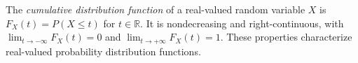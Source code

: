 
The \emph{cumulative distribution function} of a real-valued random variable $X$ is $F_X(t)=P(X\le t)$ for $t\in\mathbb R$. It is nondecreasing and right-continuous, with $\lim_{t\to-\infty}F_X(t)=0$ and $\lim_{t\to+\infty}F_X(t)=1$. These properties characterize real-valued probability distribution functions.
